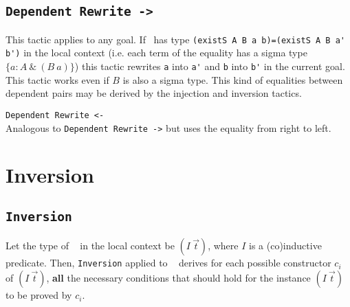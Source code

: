 
\subsection{\tt Dependent Rewrite -> {\ident}}
\label{Dependent-Rewrite}
This tactic applies to any goal.  If \ident\ has type 
\verb+(existS A B a b)=(existS A B a' b')+ 
in the local context (i.e. each term of the
equality has a sigma type $\{ a:A~ \&~(B~a)\}$) this tactic rewrites
\verb+a+ into \verb+a'+ and \verb+b+ into \verb+b'+ in the current
goal. This tactic works even if $B$ is also a sigma type.  This kind
of equalities between dependent pairs may be derived by the injection
and inversion tactics.

\begin{Variants}
\item{\tt Dependent Rewrite <- {\ident}}
 \\
Analogous to {\tt Dependent Rewrite ->} but uses the equality from
right to left.
\end{Variants}

\section{Inversion}
\label{Inversion}

\subsection{\tt Inversion {\ident}}

Let the type of \ident~ in the local context be $(I~\vec{t})$,
where $I$ is a (co)inductive predicate. Then,
\texttt{Inversion} applied to \ident~ derives for each possible
constructor $c_i$ of $(I~\vec{t})$, {\bf all} the necessary
conditions that should hold for the instance $(I~\vec{t})$ to be
proved by $c_i$.

